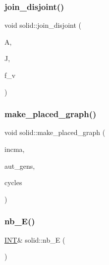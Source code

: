 \subsubsection{\texorpdfstring{join\+\_\+disjoint()}{join\_disjoint()}}
{\footnotesize\ttfamily void solid\+::join\+\_\+disjoint (\begin{DoxyParamCaption}\item[{\mbox{\hyperlink{classsolid}{solid}} \&}]{A,  }\item[{\mbox{\hyperlink{classsolid}{solid}} \&}]{J,  }\item[{\mbox{\hyperlink{galois_8h_a09fddde158a3a20bd2dcadb609de11dc}{I\+NT}}}]{f\+\_\+v }\end{DoxyParamCaption})}

\mbox{\label{classsolid_a67a153cfb0673d8b90e81cb45064626c}} 
\subsubsection{\texorpdfstring{make\+\_\+placed\+\_\+graph()}{make\_placed\_graph()}}
{\footnotesize\ttfamily void solid\+::make\+\_\+placed\+\_\+graph (\begin{DoxyParamCaption}\item[{\mbox{\hyperlink{classmatrix}{matrix}} \&}]{incma,  }\item[{\mbox{\hyperlink{class_vector}{Vector}} \&}]{aut\+\_\+gens,  }\item[{\mbox{\hyperlink{class_vector}{Vector}} \&}]{cycles }\end{DoxyParamCaption})}

\mbox{\label{classsolid_abf4c4af23b0746c618d03d63b32a9e7e}} 
\subsubsection{\texorpdfstring{nb\+\_\+\+E()}{nb\_E()}}
{\footnotesize\ttfamily \mbox{\hyperlink{galois_8h_a09fddde158a3a20bd2dcadb609de11dc}{I\+NT}}\& solid\+::nb\+\_\+E (\begin{DoxyParamCaption}{ }\end{DoxyParamCaption})\hspace{0.3cm}{\ttfamily [inline]}}

